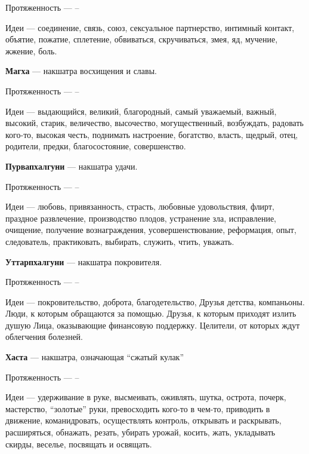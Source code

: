 \begin{myenum}
\begin{mydescr}
			\item[Протяженность] ---  -- 
			\item[Идеи] --- соединение, связь, союз, сексуальное партнерство, интимный контакт, объятие, пожатие, сплетение, обвиваться, скручиваться, змея, яд, мучение, жжение, боль.
		\end{mydescr}
	\item \textbf{Магха} --- накшатра восхищения и славы.
		\begin{mydescr}
			\item[Протяженность] ---  -- 
			\item[Идеи] --- выдающийся, великий, благородный, самый уважаемый, важный, высокий, старик, величество, высочество, могущественный, возбуждать, радовать кого-то, высокая честь, поднимать настроение, богатство, власть, щедрый, отец, родители, предки, благосостояние, совершенство.
		\end{mydescr}
	\item \textbf{Пурвапхалгуни} --- накшатра удачи.
		\begin{mydescr}
			\item[Протяженность] ---  -- \signum{26}{40}{\leo}
			\item[Идеи] --- любовь, привязанность, страсть, любовные удовольствия, флирт, праздное развлечение, производство плодов, устранение зла, исправление, очищение, получение вознаграждения, усовершенствование, реформация, опыт, следователь, практиковать, выбирать, служить, чтить, уважать.
		\end{mydescr}
	\item \textbf{Уттарпхалгуни} --- накшатра покровителя.
		\begin{mydescr}
			\item[Протяженность] ---  -- \signum{10}{}{\virgo}
			\item[Идеи] --- покровительство, доброта, благодетельство, Друзья детства, компаньоны. Люди, к которым обращаются за помощью. Друзья, к которым приходят излить душую Лица, оказывающие финансовую поддержку. Целители, от которых ждут облегчения болезней.
		\end{mydescr}
	\item \textbf{Хаста} --- накшатра, означающая ``сжатый кулак''
		\begin{mydescr}
			\item[Протяженность] ---  -- \signum{23}{20}{\virgo}
			\item[Идеи] --- удерживание в руке, высмеивать, оживлять, шутка, острота, почерк, мастерство, ``золотые'' руки, превосходить кого-то в чем-то, приводить в движение, команидровать, осуществлять контроль, открывать и раскрывать, расширяться, обнажать, резать, убирать урожай, косить, жать, укладывать скирды, веселье, посвящать и освящать.

\end{mydescr}
\end{myenum}
